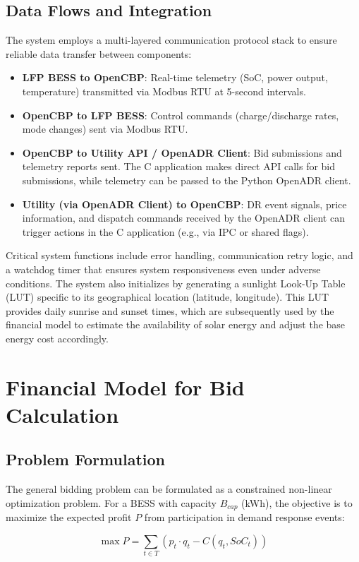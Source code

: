 \documentclass[11pt,a4paper]{article}
\begin{document}
\subsection{Data Flows and Integration}
The system employs a multi-layered communication protocol stack to ensure reliable data transfer between components:

\begin{itemize}
    \item \textbf{LFP BESS to OpenCBP}: Real-time telemetry (SoC, power output, temperature) transmitted via Modbus RTU at 5-second intervals.
    \item \textbf{OpenCBP to LFP BESS}: Control commands (charge/discharge rates, mode changes) sent via Modbus RTU.
    \item \textbf{OpenCBP to Utility API / OpenADR Client}: Bid submissions and telemetry reports sent. The C application makes direct API calls for bid submissions, while telemetry can be passed to the Python OpenADR client.
    \item \textbf{Utility (via OpenADR Client) to OpenCBP}: DR event signals, price information, and dispatch commands received by the OpenADR client can trigger actions in the C application (e.g., via IPC or shared flags).
\end{itemize}

Critical system functions include error handling, communication retry logic, and a watchdog timer that ensures system responsiveness even under adverse conditions. The system also initializes by generating a sunlight Look-Up Table (LUT) specific to its geographical location (latitude, longitude). This LUT provides daily sunrise and sunset times, which are subsequently used by the financial model to estimate the availability of solar energy and adjust the base energy cost accordingly.

\section{Financial Model for Bid Calculation}
\subsection{Problem Formulation}
The general bidding problem can be formulated as a constrained non-linear optimization problem. For a BESS with capacity $B_{cap}$ (kWh), the objective is to maximize the expected profit $P$ from participation in demand response events:

\begin{equation}
\max P = \sum_{t \in T} (p_t \cdot q_t - C(q_t, SoC_t))
\end{equation}
\end{document}
